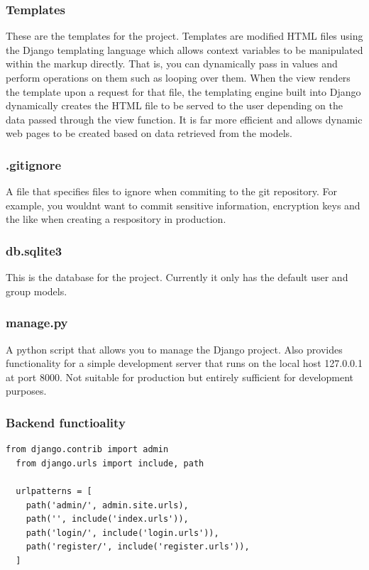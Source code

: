 \documentclass{article}
\begin{document}
\subsubsection{Templates}

These are the templates for the project. Templates are modified HTML files using the Django templating language which allows context variables to be manipulated within the markup directly. That is, you can dynamically pass in values and perform operations on them such as looping over them. When the view renders the template upon a request for that file, the templating engine built into Django dynamically creates the HTML file to be served to the user depending on the data passed through the view function. It is far more efficient and allows dynamic web pages to be created based on data retrieved from the models. 

\subsubsection{.gitignore}

A file that specifies files to ignore when commiting to the git repository. For example, you wouldnt want to commit sensitive information, encryption keys and the like when creating a respository in production. 

\subsubsection{db.sqlite3}

This is the database for the project. Currently it only has the default user and group models. 

\subsubsection{manage.py}

A python script that allows you to manage the Django project. Also provides functionality for a simple development server that runs on the local host 127.0.0.1 at port 8000. Not suitable for production but entirely sufficient for development purposes. 

\subsubsection{Backend functioality}

\begin{lstlisting}[caption={master/urls.py}]
  from django.contrib import admin
  from django.urls import include, path

  urlpatterns = [
    path('admin/', admin.site.urls),
    path('', include('index.urls')),
    path('login/', include('login.urls')),
    path('register/', include('register.urls')),
  ]
\end{lstlisting}
\end{document}
